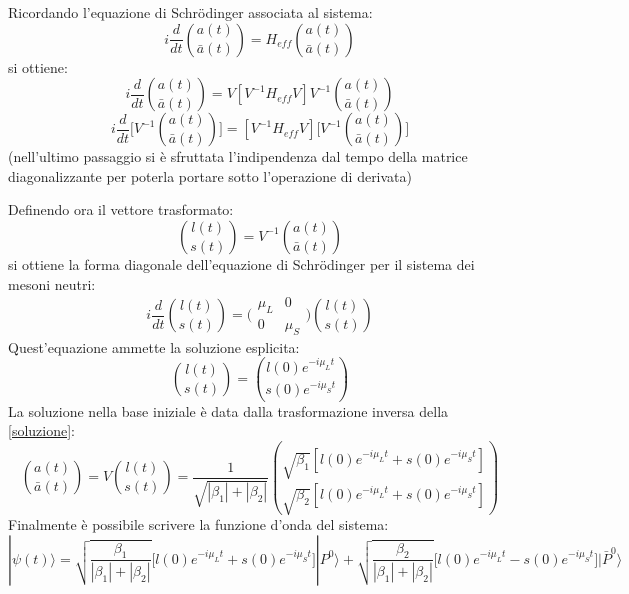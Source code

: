 Ricordando l'equazione di Schr\"{o}dinger associata al sistema:
\begin{equation}
i\frac{d}{dt} \binom{a(t)}{\bar{a}(t)} = H_{eff} \binom{a(t)}{\bar{a}(t)}
\end{equation}
si ottiene:
\begin{equation*}
 i\frac{d}{dt} \binom{a(t)}{\bar{a}(t)} = V[V^{-1}H_{eff}V]V^{-1} \binom{a(t)}{\bar{a}(t)}
\end{equation*}
\begin{equation}
 i\frac{d}{dt} \Big[V^{-1}\binom{a(t)}{\bar{a}(t)}\Big] = [V^{-1}H_{eff}V] \Big[V^{-1}\binom{a(t)}{\bar{a}(t)}\Big]
\end{equation}
(nell'ultimo passaggio si è sfruttata l'indipendenza dal tempo della matrice diagonalizzante per poterla portare sotto l'operazione di derivata)

Definendo ora il vettore trasformato:
\begin{equation}
 \binom{l(t)}{s(t)} = V^{-1}\binom{a(t)}{\bar{a}(t)} 
\end{equation}
si ottiene la forma diagonale dell'equazione di Schr\"{o}dinger per il sistema dei mesoni neutri:
\begin{equation}
 i\frac{d}{dt}\binom{l(t)}{s(t)} = \Big( \begin{matrix} \mu_L & 0 \\ 0 & \mu_S \end{matrix}\Big) \binom{l(t)}{s(t)}
\end{equation}
Quest'equazione ammette la soluzione esplicita:
\begin{equation}\label{soluzione}
 \binom{l(t)}{s(t)} = \binom{l(0)e^{-i\mu_Lt}}{s(0)e^{-i\mu_St}}
\end{equation}
La soluzione nella base iniziale è data dalla trasformazione inversa della \eqref{soluzione}:
\begin{equation}
  \binom{a(t)}{\bar{a}(t)} = V\binom{l(t)}{s(t)} = \frac{1}{\sqrt{|\beta_1|+|\beta_2|}} \binom{\sqrt{\beta_1}[l(0)e^{-i\mu_Lt} + s(0)e^{-i\mu_St}]}{\sqrt{\beta_2}[l(0)e^{-i\mu_Lt} + s(0)e^{-i\mu_St}]}
\end{equation}
Finalmente è possibile scrivere la funzione d'onda del sistema:
\begin{equation}
 |\psi(t)\rangle = \sqrt{\frac{\beta_1}{|\beta_1|+|\beta_2|}} \Big[l(0)e^{-i\mu_Lt}+s(0)e^{-i\mu_St}\Big]|P^0\rangle + \sqrt{\frac{\beta_2}{|\beta_1|+|\beta_2|}}\Big[l(0)e^{-i\mu_Lt}-s(0)e^{-i\mu_St}\Big]|\bar{P}^0\rangle
\end{equation}

